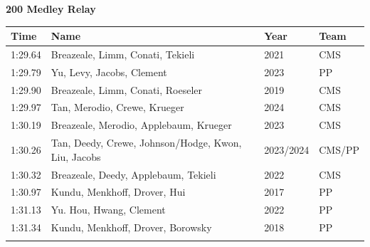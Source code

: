 \noindent\begin{minipage}[t]{0.98\textwidth}
\centering
\textbf{\textcolor{teamprimary}{200 Medley Relay}}\par
\vspace{0.5em}
\centering
\small
\renewcommand{\arraystretch}{1.0}
\setlength{\tabcolsep}{4pt}
\begin{tabular}{@{}p{2.7cm}p{4.3cm}p{1.6cm}p{2.7cm}@{}}
\toprule
\textbf{Time} & \textbf{Name} & \textbf{Year} & \textbf{Team} \\
\midrule
1:29.64 & Breazeale, Limm, Conati, Tekieli & 2021 & CMS \\
1:29.79 & Yu, Levy, Jacobs, Clement & 2023 & PP \\
1:29.90 & Breazeale, Limm, Conati, Roeseler & 2019 & CMS \\
1:29.97 & Tan, Merodio, Crewe, Krueger & 2024 & CMS \\
1:30.19 & Breazeale, Merodio, Applebaum, Krueger & 2023 & CMS \\
1:30.26 & Tan, Deedy, Crewe, Johnson/Hodge, Kwon, Liu, Jacobs & 2023/2024 & CMS/PP \\
1:30.32 & Breazeale, Deedy, Applebaum, Tekieli & 2022 & CMS \\
1:30.97 & Kundu, Menkhoff, Drover, Hui & 2017 & PP \\
1:31.13 & Yu. Hou, Hwang, Clement & 2022 & PP \\
1:31.34 & Kundu, Menkhoff, Drover, Borowsky & 2018 & PP \\
\bottomrule
\vspace{0.5em}
\end{tabular}
\end{minipage}
\vspace{1.2em}
